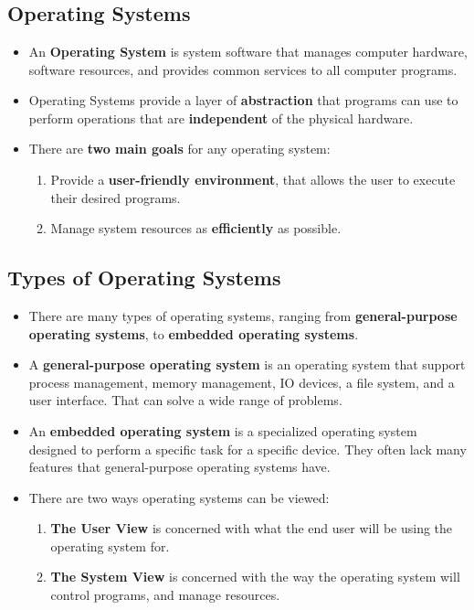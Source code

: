 \documentclass[16pt]{article}
\begin{document}
\section*{}

    \subsection*{Operating Systems}
    \begin{itemize}
        \item An \textbf{Operating System} is system software that manages computer hardware, software resources, and provides common services to all computer programs.
        \item Operating Systems provide a layer of \textbf{abstraction} that programs can use to perform operations that are \textbf{independent} of the physical hardware.
        \item There are \textbf{two main goals} for any operating system:
        \begin{enumerate}
            \item Provide a \textbf{user-friendly environment}, that allows the user to execute their desired programs.
            \item Manage system resources as \textbf{efficiently} as possible.
        \end{enumerate}
    \end{itemize}
    
    \subsection*{Types of Operating Systems}
    \begin{itemize}
        \item There are many types of operating systems, ranging from \textbf{general-purpose operating systems}, to \textbf{embedded operating systems}.
        \item A \textbf{general-purpose operating system} is an operating system that support process management, memory management, IO devices, a file system, and a user interface. That can solve a wide range of problems.
        \item An \textbf{embedded operating system} is a specialized operating system designed to perform a specific task for a specific device. They often lack many features that general-purpose operating systems have. 
        \item There are two ways operating systems can be viewed:
        \begin{enumerate}
            \item \textbf{The User View} is concerned with what the end user will be using the operating system for.
            \item \textbf{The System View} is concerned with the way the operating system will control programs, and manage resources.
        \end{enumerate}
    \end{itemize}
    
\end{document}
